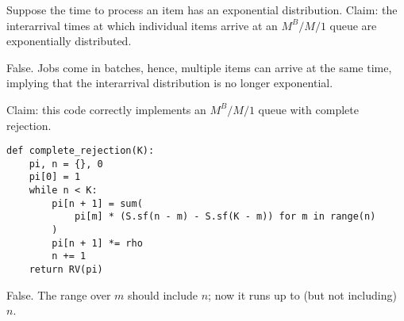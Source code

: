\documentclass[stochastic-or.tex]{subfiles}
\begin{document}
\begin{truefalse}
Suppose the time to process an item has an exponential distribution.
Claim: the interarrival times at which individual items arrive at an $M^B/M/1$ queue are exponentially distributed.
\begin{solution}
        False. Jobs come in batches, hence, multiple items can arrive at the same time, implying that the interarrival distribution is no longer exponential.
\end{solution}
\end{truefalse}




\begin{truefalse}
Claim: this code correctly implements an $M^{B}/M/1$ queue with complete rejection.
\begin{verbatim}
def complete_rejection(K):
    pi, n = {}, 0
    pi[0] = 1
    while n < K:
        pi[n + 1] = sum(
            pi[m] * (S.sf(n - m) - S.sf(K - m)) for m in range(n)
        )
        pi[n + 1] *= rho
        n += 1
    return RV(pi)
\end{verbatim}
\begin{solution}
    False. The range over $m$ should include $n$; now it runs up to (but not including) $n$.
\end{solution}
\end{truefalse}
\end{document}
